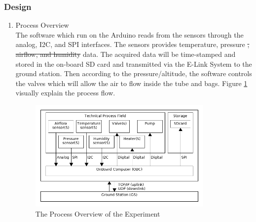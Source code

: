 \documentclass[a4paper,12pt,twoside]{article}
\providecommand{\DIFaddtex}[1]{{\protect\color{blue}\uwave{#1}}} %
\providecommand{\DIFdeltex}[1]{{\protect\color{red}\sout{#1}}}                      %
\providecommand{\DIFaddbegin}{} %
\providecommand{\DIFaddend}{} %
\providecommand{\DIFdelbegin}{} %
\providecommand{\DIFdelend}{} %
\providecommand{\DIFaddFL}[1]{\DIFadd{#1}} %
\providecommand{\DIFaddbeginFL}{} %
\providecommand{\DIFaddendFL}{} %
\providecommand{\DIFadd}[1]{\texorpdfstring{\DIFaddtex{#1}}{#1}} %
\providecommand{\DIFdel}[1]{\texorpdfstring{\DIFdeltex{#1}}{}} %
\newcommand{\DIFscaledelfig}{0.5}
\newlength{\DIFdelgraphicswidth} %
\newlength{\DIFdelgraphicsheight} %
\newcommand{\DIFaddincludegraphics}[2][]{{\color{blue}\fbox{\DIFOincludegraphics[#1]{#2}}}} %
\newcommand{\DIFdelincludegraphics}[2][]{%
\sbox{\DIFdelgraphicsbox}{\DIFOincludegraphics[#1]{#2}}%
\settoboxwidth{\DIFdelgraphicswidth}{\DIFdelgraphicsbox} %
\settoboxtotalheight{\DIFdelgraphicsheight}{\DIFdelgraphicsbox} %
\scalebox{\DIFscaledelfig}{%
\parbox[b]{\DIFdelgraphicswidth}{\usebox{\DIFdelgraphicsbox}\\[-\baselineskip] \rule{\DIFdelgraphicswidth}{0em}}\llap{\resizebox{\DIFdelgraphicswidth}{\DIFdelgraphicsheight}{%
\setlength{\unitlength}{\DIFdelgraphicswidth}%
\begin{picture}(1,1)%
\thicklines\linethickness{2pt} %
{\color[rgb]{1,0,0}\put(0,0){\framebox(1,1){}}}%
{\color[rgb]{1,0,0}\put(0,0){\line( 1,1){1}}}%
{\color[rgb]{1,0,0}\put(0,1){\line(1,-1){1}}}%
\end{picture}%
}\hspace*{3pt}}} %
} %
\DeclareRobustCommand{\DIFaddbegin}{\DIFOaddbegin \let\includegraphics\DIFaddincludegraphics} %
\DeclareRobustCommand{\DIFaddend}{\DIFOaddend \let\includegraphics\DIFOincludegraphics} %
\DeclareRobustCommand{\DIFdelbegin}{\DIFOdelbegin \let\includegraphics\DIFdelincludegraphics} %
\DeclareRobustCommand{\DIFdelend}{\DIFOaddend \let\includegraphics\DIFOincludegraphics} %
\DeclareRobustCommand{\DIFaddbeginFL}{\DIFOaddbeginFL \let\includegraphics\DIFaddincludegraphics} %
\DeclareRobustCommand{\DIFaddendFL}{\DIFOaddendFL \let\includegraphics\DIFOincludegraphics} %
\begin{document}
\subsubsection{Design} \label{sec:4.8.2}
\begin{enumerate}[label=(\alph*)]
\item{Process Overview}\\
The software which run on the Arduino reads from the sensors through the analog, I2C, and SPI interfaces. The sensors provides temperature, pressure \DIFdelbegin \DIFdel{, airflow, and humidity }\DIFdelend \DIFaddbegin \DIFadd{and airflow }\DIFaddend data. The acquired data will be time-stamped and stored in the on-board SD card and transmitted via the E-Link System to the ground station. Then according to the pressure/altitude, the software controls the valves which will allow the air to flow inside the tube and bags. Figure \ref{processOverview} visually explain the process flow.

\begin{figure}[H]
    \centering
    \includegraphics[width=0.85\textwidth]{4-experiment-design/img/Process-overview-V0-2.png}
    \caption{The Process Overview of the Experiment\DIFaddbeginFL \DIFaddFL{.}\DIFaddendFL }
    \label{processOverview}
\end{figure}


\end{enumerate}
\end{document}
